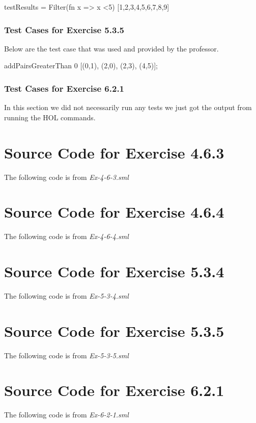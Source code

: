\documentclass{report}
\begin{document}
testResults = Filter(fn x => x <5) [1,2,3,4,5,6,7,8,9]

\subsection{Test Cases for Exercise 5.3.5}
\label{sec:test-cases-ex-5-3-5}
Below are the test case that was used and provided by the professor.

addPairsGreaterThan 0 [(0,1), (2,0), (2,3), (4,5)];

\subsection{Test Cases for Exercise 6.2.1}
\label{sec:test-cases-ex-6-2-1}
In this section we did not necessarily run any tests we just got the
output from running the HOL commands.


\appendix{} 


\chapter{Source Code for  Exercise 4.6.3}
\label{cha:source-code-ex-4-6-3}

The following code is from \emph{Ex-4-6-3.sml}


\chapter{Source Code for  Exercise 4.6.4}
\label{cha:source-code-ex-4-6-4}

The following code is from \emph{Ex-4-6-4.sml}


\chapter{Source Code for  Exercise 5.3.4}
\label{cha:source-code-ex-5-3-4}

The following code is from \emph{Ex-5-3-4.sml}


\chapter{Source Code for  Exercise 5.3.5}
\label{cha:source-code-ex-5-3-5}

The following code is from \emph{Ex-5-3-5.sml}


\chapter{Source Code for  Exercise 6.2.1}
\label{cha:source-code-ex-6-2-1}

The following code is from \emph{Ex-6-2-1.sml}

\end{document}
